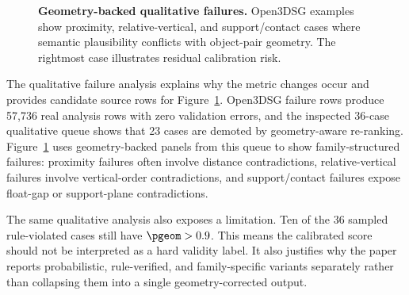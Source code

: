 \begin{figure}[t]
    \centering
    \caption{\textbf{Geometry-backed qualitative failures.} Open3DSG examples
    show proximity, relative-vertical, and support/contact cases where semantic
    plausibility conflicts with object-pair geometry. The rightmost case
    illustrates residual calibration risk.}
    \label{fig:failures}
\end{figure}

The qualitative failure analysis explains why the metric changes occur and
provides candidate source rows for Figure~\ref{fig:failures}. Open3DSG failure
rows produce 57,736 real analysis rows with zero validation errors, and the
inspected 36-case qualitative queue shows that 23 cases are demoted by
geometry-aware re-ranking. Figure~\ref{fig:failures} uses geometry-backed
panels from this queue to show family-structured failures: proximity failures
often involve distance contradictions, relative-vertical failures involve
vertical-order contradictions, and support/contact failures expose float-gap or
support-plane contradictions.

The same qualitative analysis also exposes a limitation. Ten of the 36 sampled
rule-violated cases still have $\pgeom > 0.9$. This means the calibrated score
should not be interpreted as a hard validity label. It also justifies why the
paper reports probabilistic, rule-verified, and family-specific variants
separately rather than collapsing them into a single geometry-corrected output.

